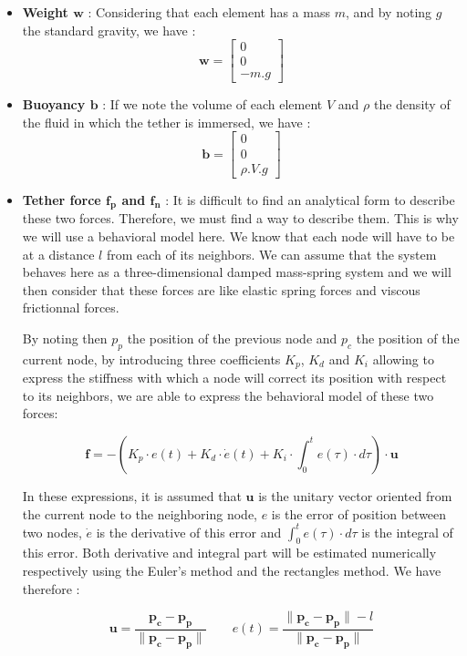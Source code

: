 \begin{itemize}
    \item \textbf{Weight $\mathbf{w}$} : Considering that each element has a mass $m$, and by noting $g$ the standard gravity, we have : $$\mathbf{w} = \begin{bmatrix}0\\ 0\\ -m.g\end{bmatrix}$$
    \item \textbf{Buoyancy $\mathbf{b}$} : If we note the volume of each element $V$ and $\rho$ the density of the fluid in which the tether is immersed, we have : $$\mathbf{b} = \begin{bmatrix}0\\ 0\\ \rho.V.g\end{bmatrix}$$
    \item \textbf{Tether force $\mathbf{f_p}$ and $\mathbf{f_n}$} : It is difficult to find an analytical form to describe these two forces. Therefore, we must find a way to describe them. This is why we will use a behavioral model here. We know that each node will have to be at a distance $l$ from each of its neighbors. We can assume that the system behaves here as a three-dimensional damped mass-spring system and we will then consider that these forces are like elastic spring forces and viscous frictionnal forces.

    By noting then $p_{p}$ the position of the previous node and $p_{c}$ the position of the current node, by introducing three coefficients $K_p$, $K_d$ and $K_i$ allowing to express the stiffness with which a node will correct its position with respect to its neighbors, we are able to express the behavioral model of these two forces:
    
    $$\mathbf{f} = - \left(K_p \cdot e(t) + K_d \cdot \dot e(t) + K_i \cdot \int_{0}^te(\tau) \cdot d\tau \right) \cdot \mathbf{u}$$
    
    In these expressions, it is assumed that $\mathbf{u}$ is the unitary vector oriented from the current node to the neighboring node, $e$ is the error of position between two nodes, $\dot e$ is the derivative of this error and $\int_{0}^te(\tau) \cdot d\tau$ is the integral of this error. Both derivative and integral part will be estimated numerically respectively using the Euler's method and the rectangles method. We have therefore :
    
    $$\mathbf{u} = \frac{\mathbf{p_c} - \mathbf{p_p}}{\|\mathbf{p_c} - \mathbf{p_p}\|} \qquad e(t) = \frac{\|\mathbf{p_c} - \mathbf{p_p}\| - l}{\|\mathbf{p_c} - \mathbf{p_p}\|}$$
    

\end{itemize}
